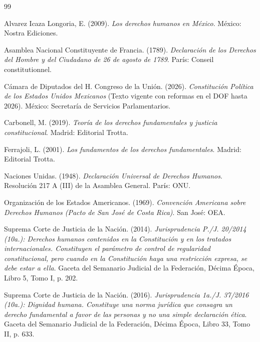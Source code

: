 \documentclass[12pt,spanish,letterpaper,oneside]{article}
\begin{document}
\clearpage
\begin{thebibliography}{99}

Alvarez Icaza Longoria, E. (2009). \emph{Los derechos humanos en M\'exico}. M\'exico: Nostra Ediciones.

Asamblea Nacional Constituyente de Francia. (1789). \emph{Declaraci\'on de los Derechos del Hombre y del Ciudadano de 26 de agosto de 1789}. Par\'is: Conseil constitutionnel.

C\'amara de Diputados del H. Congreso de la Uni\'on. (2026). \emph{Constituci\'on Pol\'itica de los Estados Unidos Mexicanos} (Texto vigente con reformas en el DOF hasta 2026). M\'exico: Secretar\'ia de Servicios Parlamentarios.

Carbonell, M. (2019). \emph{Teor\'ia de los derechos fundamentales y justicia constitucional}. Madrid: Editorial Trotta.

Ferrajoli, L. (2001). \emph{Los fundamentos de los derechos fundamentales}. Madrid: Editorial Trotta.

Naciones Unidas. (1948). \emph{Declaraci\'on Universal de Derechos Humanos}. Resoluci\'on 217 A (III) de la Asamblea General. Par\'is: ONU.

Organizaci\'on de los Estados Americanos. (1969). \emph{Convenci\'on Americana sobre Derechos Humanos (Pacto de San Jos\'e de Costa Rica)}. San Jos\'e: OEA.

Suprema Corte de Justicia de la Naci\'on. (2014). \emph{Jurisprudencia P./J. 20/2014 (10a.): Derechos humanos contenidos en la Constituci\'on y en los tratados internacionales. Constituyen el par\'ametro de control de regularidad constitucional, pero cuando en la Constituci\'on haya una restricci\'on expresa, se debe estar a ella}. Gaceta del Semanario Judicial de la Federaci\'on, D\'ecima \'Epoca, Libro 5, Tomo I, p. 202.

Suprema Corte de Justicia de la Naci\'on. (2016). \emph{Jurisprudencia 1a./J. 37/2016 (10a.): Dignidad humana. Constituye una norma jur\'idica que consagra un derecho fundamental a favor de las personas y no una simple declaraci\'on \'etica}. Gaceta del Semanario Judicial de la Federaci\'on, D\'ecima \'Epoca, Libro 33, Tomo II, p. 633.

\end{thebibliography}
\end{document}
